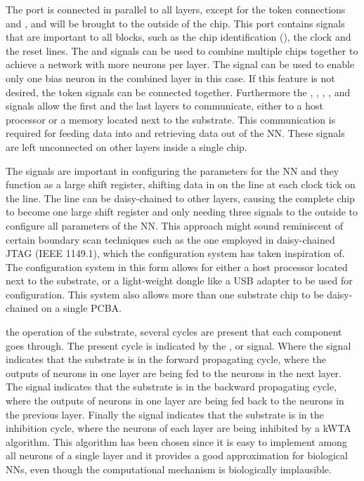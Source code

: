The  port is connected in parallel to all layers, except for the token connections  and , and will be brought to the outside of the chip. This port contains signals that are important to all blocks, such as the chip identification (), the clock and the reset lines. The  and  signals can be used to combine multiple chips together to achieve a network with more neurons per layer. The  signal can be used to enable only one bias neuron in the combined layer in this case. If this feature is not desired, the token signals can be connected together. Furthermore the , , , ,  and  signals allow the first and the last layers to communicate, either to a host processor or a memory located next to the substrate. This communication is required for feeding data into and retrieving data out of the \ac{NN}. These signals are left unconnected on other layers inside a single chip.

The  signals are important in configuring the parameters for the \ac{NN} and they function as a large shift register, shifting data in on the  line at each clock tick on the  line. The  line can be daisy-chained to other layers, causing the complete chip to become one large shift register and only needing three signals to the outside to configure all parameters of the \ac{NN}. This approach might sound reminiscent of certain boundary scan techniques such as the one employed in daisy-chained JTAG (IEEE 1149.1)\cite{718268}, which the configuration system has taken inspiration of. The configuration system in this form allows for either a host processor located next to the substrate, or a light-weight dongle like a USB adapter to be used for configuration. This system also allows more than one substrate chip to be daisy-chained on a single \ac{PCBA}.

 the operation of the substrate, several cycles are present that each component goes through. The present cycle is indicated by the ,  or  signal. Where the  signal indicates that the substrate is in the forward propagating cycle, where the outputs of neurons in one layer are being fed to the neurons in the next layer. The  signal indicates that the substrate is in the backward propagating cycle, where the outputs of neurons in one layer are being fed back to the neurons in the previous layer. Finally the  signal indicates that the substrate is in the inhibition cycle, where the neurons of each layer are being inhibited by a \ac{kWTA} algorithm. This algorithm has been chosen since it is easy to implement among all neurons of a single layer and it provides a good approximation for biological \acp{NN}, even though the computational mechanism is biologically implausible\cite{emergentkwta}.

